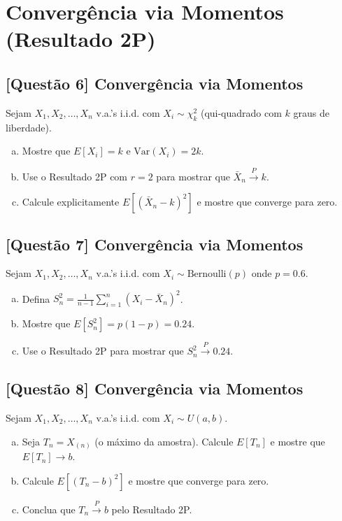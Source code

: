 \documentclass[12pt,a4paper]{article}
\begin{document}
\section{Convergência via Momentos (Resultado 2P)}

\subsection*{[Questão 6] Convergência via Momentos}

Sejam $X_1, X_2, \ldots, X_n$ v.a.'s i.i.d. com $X_i \sim \chi^2_k$ (qui-quadrado com $k$ graus de liberdade).

\begin{enumerate}[(a)]
    \item Mostre que $E[X_i] = k$ e $\text{Var}(X_i) = 2k$.
    \item Use o Resultado 2P com $r = 2$ para mostrar que $\bar{X}_n \xrightarrow{P} k$.
    \item Calcule explicitamente $E[(\bar{X}_n - k)^2]$ e mostre que converge para zero.
\end{enumerate}

\subsection*{[Questão 7] Convergência via Momentos}

Sejam $X_1, X_2, \ldots, X_n$ v.a.'s i.i.d. com $X_i \sim \text{Bernoulli}(p)$ onde $p = 0.6$.

\begin{enumerate}[(a)]
    \item Defina $S_n^2 = \frac{1}{n-1}\sum_{i=1}^n (X_i - \bar{X}_n)^2$.
    \item Mostre que $E[S_n^2] = p(1-p) = 0.24$.
    \item Use o Resultado 2P para mostrar que $S_n^2 \xrightarrow{P} 0.24$.
\end{enumerate}

\subsection*{[Questão 8] Convergência via Momentos}

Sejam $X_1, X_2, \ldots, X_n$ v.a.'s i.i.d. com $X_i \sim U(a, b)$.

\begin{enumerate}[(a)]
    \item Seja $T_n = X_{(n)}$ (o máximo da amostra). Calcule $E[T_n]$ e mostre que $E[T_n] \to b$.
    \item Calcule $E[(T_n - b)^2]$ e mostre que converge para zero.
    \item Conclua que $T_n \xrightarrow{P} b$ pelo Resultado 2P.
\end{enumerate}
\end{document}
